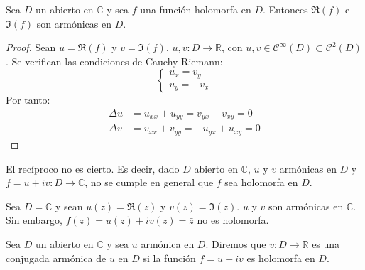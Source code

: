 \begin{theorem}
    Sea $D$ un abierto en $\mathbb{C}$ y sea $f$ una función holomorfa en $D$.
    Entonces $\Re(f)$ e $\Im(f)$ son armónicas en $D$.
\end{theorem}

\begin{proof}
    Sean $u = \Re(f)$ y $v = \Im(f)$, $u, v: D \to \mathbb{R}$, con $u, v \in \mathcal{C}^\infty(D) \subset \mathcal{C}^2(D)$.
    Se verifican las condiciones de Cauchy-Riemann:
    $$\begin{cases}
            u_x = v_y \\
            u_y = -v_x
        \end{cases}$$
    Por tanto:
    \begin{align*}
        \Delta u & = u_{xx} + u_{yy} = v_{yx} - v_{xy} = 0  \\
        \Delta v & = v_{xx} + v_{yy} = -u_{yx} + u_{xy} = 0
    \end{align*}
\end{proof}

El recíproco no es cierto.
Es decir, dado $D$ abierto en $\mathbb{C}$, $u$ y $v$ armónicas en $D$ y $f = u + iv: D \to \mathbb{C}$, no se cumple en general que $f$ sea holomorfa en $D$.

\begin{example}[Contraejemplo]
    Sea $D = \mathbb{C}$ y sean $u(z) = \Re(z)$ y $v(z) = \Im(z)$.
    $u$ y $v$ son armónicas en $\mathbb{C}$.
    Sin embargo, $f(z) = u(z) + iv(z) = \bar{z}$ no es holomorfa.
\end{example}

\begin{definition}
    Sea $D$ un abierto en $\mathbb{C}$ y sea $u$ armónica en $D$.
    Diremos que $v: D \to \mathbb{R}$ es una conjugada armónica de $u$ en $D$ si la función $f = u + iv$ es holomorfa en $D$.
\end{definition}

